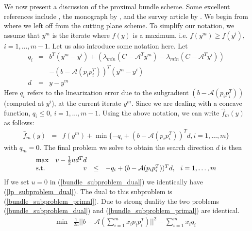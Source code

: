 \documentclass[12pt]{kluwer}
\begin{document}
\begin{article}
We now present a discussion of the proximal bundle scheme. Some excellent references include
, the monograph by ,
and the survey article by . We begin from where we left off
from the cutting plane scheme.
To simplify our notation, we assume that $y^m$ is the iterate where $f(y)$ is a maximum,
i.e. $f(y^m) \ge f(y^i)$, $i=1,\ldots,m-1$. Let us also introduce some notation here.
Let
\begin{displaymath}
\begin{array}{ccc}
q_i & = & b^T(y^m-y^i) + (\lambda_{min}(C-\mathcal{A}^Ty^m) - \lambda_{min}(C-\mathcal{A}^Ty^i)) \\
& & -(b - \mathcal{A}(p_ip_i^T))^T(y^m-y^i) \\
d & = & y - y^m
\end{array}
\end{displaymath}
Here $q_i$ refers to the linearization error due to the subgradient $(b-\mathcal{A}(p_ip_i^T))$
(computed at $y^i$), at the current iterate $y^m$. Since we are dealing with a concave function,
$q_i \le 0$, $i=1,\ldots,m-1$. Using the above notation, we can write $\hat{f}_m(y)$ as follows:
\begin{equation}
\label{define_hat_f_m}
\begin{array}{ccc}
\hat{f}_m(y) & = & f(y^m) + \min \{-q_i + (b-\mathcal{A}(p_ip_i^T))^Td, i=1,\ldots,m\}
\end{array}
\end{equation}
with $q_m = 0$. The final problem we solve to obtain the search direction $d$ is then
\begin{equation}
\label{bundle_subproblem_dual}
\begin{array}{lrcc}
\max & v - \frac{1}{2}ud^Td \\
\mbox{s.t.} & v & \le & -q_i + (b-\mathcal{A}(p_ip_i^T))^Td, \hspace*{0.25cm} i=1,\ldots,m
\end{array}
\end{equation}
If we set $u=0$ in (\ref{bundle_subproblem_dual}) we identically have (\ref{lp_subproblem_dual}).
The dual to this subproblem is (\ref{bundle_subproblem_primal}). Due to strong duality the two
problems (\ref{bundle_subproblem_dual}) and (\ref{bundle_subproblem_primal}) are identical.
\begin{equation}
\label{bundle_subproblem_primal}
\begin{array}{lrcc}
\min & \frac{1}{2u} ||b - \mathcal{A}(\sum_{i=1}^mx_ip_ip_i^T)||^2 - \sum_{i=1}^mx_iq_i \\

\end{array}
\end{equation}
\end{article}
\end{document}
